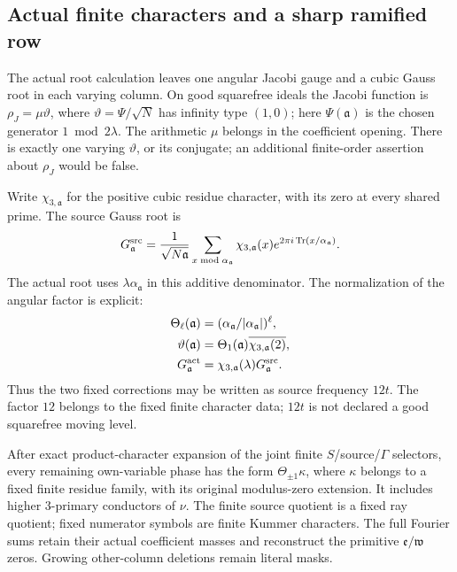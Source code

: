 \subsection{Actual finite characters and a sharp ramified row}
\label{rg:row}
The actual root calculation leaves one angular Jacobi gauge and a
cubic Gauss root in each varying column. On good squarefree ideals
the Jacobi function is
\(\rho_J=\mu\vartheta\), where
\(\vartheta=\Psi/\sqrt N\) has infinity type \((1,0)\); here \(\Psi(\mathfrak a)\) is the chosen generator \(1\bmod2\lambda\).
The arithmetic \(\mu\) belongs in the coefficient opening.
There is exactly one varying \(\vartheta\), or its conjugate; an
additional finite-order assertion about \(\rho_J\) would be false.

Write \(\chi_{3,\mathfrak a}\) for the positive cubic residue
character, with its zero at every shared prime. The source Gauss root is
\begin{equation}\label{rg:source-gauss}
 G_{\mathfrak a}^{\rm src}
 =\frac1{\sqrt{N\mathfrak a}}\sum_{x\bmod\alpha_{\mathfrak a}}
 \chi_{3,\mathfrak a}(x)
             e^{2\pi i\operatorname{Tr}(x/\alpha_{\mathfrak a})}.
\end{equation}
The actual root uses \(\lambda\alpha_{\mathfrak a}\) in this
additive denominator. The normalization of the angular factor is explicit:
\begin{equation}\label{rg:normalizations}
 \begin{aligned}
 \Theta_\ell(\mathfrak a)&=
       (\alpha_{\mathfrak a}/|\alpha_{\mathfrak a}|)^\ell,\\
 \vartheta(\mathfrak a)
       &=\Theta_1(\mathfrak a)
                    \overline{\chi_{3,\mathfrak a}(2)},\\
 G_{\mathfrak a}^{\rm act}
       &=\chi_{3,\mathfrak a}(\lambda)G_{\mathfrak a}^{\rm src}.
 \end{aligned}
\end{equation}
Thus the two fixed corrections may be written as source frequency
\(12t\). The factor \(12\) belongs to the fixed finite character
data; \(12t\) is not declared a good squarefree moving level.

After exact product-character expansion of the joint finite
\(S\)/source/\(\Gamma\) selectors, every remaining own-variable phase
has the form \(\Theta_{\pm1}\kappa\), where \(\kappa\) belongs to a
fixed finite residue family, with its original modulus-zero extension.
It includes higher \(3\)-primary conductors of \(\nu\).
The finite source quotient is a fixed ray quotient; fixed numerator
symbols are finite Kummer characters. The full Fourier sums retain
their actual coefficient masses and reconstruct the primitive
\(\mathfrak e/\mathfrak w\) zeros. Growing other-column deletions
remain literal masks.

